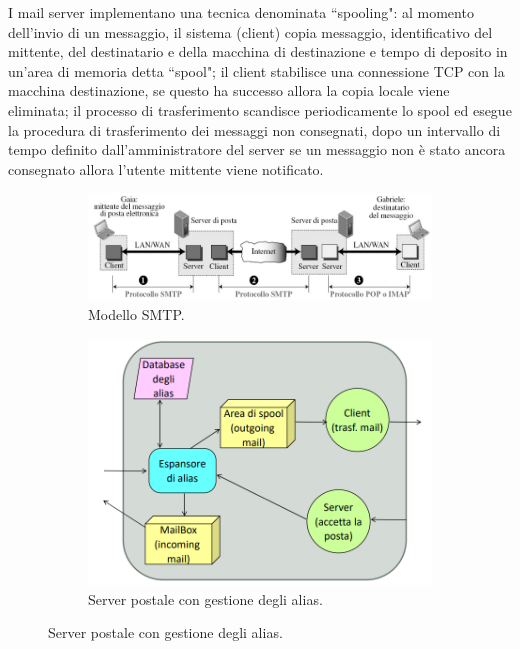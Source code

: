 \documentclass[11pt, italian, openany]{book}
\begin{document}
\begin{sloppypar}
\begin{itemize}[topsep=0pt]
	I mail server implementano una tecnica denominata ``spooling": al momento dell'invio di un messaggio, il sistema (client) copia messaggio, identificativo del
	mittente, del destinatario e della macchina di destinazione e tempo di deposito in un'area di memoria detta ``spool"; il client stabilisce una connessione TCP
	con la macchina destinazione, se questo ha successo allora la copia locale viene eliminata; il processo di trasferimento scandisce periodicamente lo spool ed
	esegue la procedura di trasferimento dei messaggi non consegnati, dopo un intervallo di tempo definito dall'amministratore del server se un messaggio non
	\`e stato ancora consegnato allora l'utente mittente viene notificato.

	\begin{figure}[!h]
		\begin{subfigure}{0.49 \linewidth} \centering
			\includegraphics[scale=0.28]{images/smtp.png}
			\caption{Modello SMTP.}
		\end{subfigure}
		\begin{subfigure}{0.49 \linewidth} \centering
			\includegraphics[scale=0.2]{images/smtp-aliasing.png}
			\caption{Server postale con gestione degli alias.}
		\end{subfigure}
	\end{figure}


\end{itemize}
\end{sloppypar}
\end{document}
